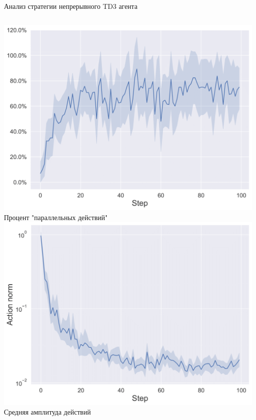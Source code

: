 \begin{frame}{Анализ стратегии непрерывного TD3 агента}
\begin{columns}
\centering
\includegraphics[width=1\linewidth]{Presentation/images/parallel_actions.png}
Процент "параллельных действий"
\centering
\includegraphics[width=1\linewidth]{Presentation/images/action_norm_decrease.png}
Средняя амплитуда действий
\end{columns}
\end{frame}

